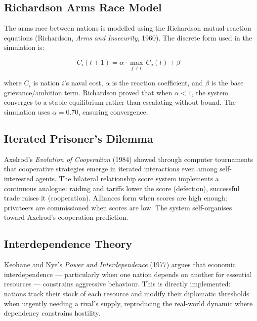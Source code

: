 \documentclass[12pt,a4paper]{article}
\begin{document}
\subsection{Richardson Arms Race Model}

The arms race between nations is modelled using the Richardson mutual-reaction equations (Richardson, \textit{Arms and Insecurity}, 1960). The discrete form used in the simulation is:

\begin{equation}
    C_i(t+1) = \alpha \cdot \max_{j \neq i}\, C_j(t) + \beta
    \label{eq:richardson}
\end{equation}

where $C_i$ is nation $i$'s naval cost, $\alpha$ is the reaction coefficient, and $\beta$ is the base grievance/ambition term. Richardson proved that when $\alpha < 1$, the system converges to a stable equilibrium rather than escalating without bound. The simulation uses $\alpha = 0.70$, ensuring convergence.

\subsection{Iterated Prisoner's Dilemma}

Axelrod's \textit{Evolution of Cooperation} (1984) showed through computer tournaments that cooperative strategies emerge in iterated interactions even among self-interested agents. The bilateral relationship score system implements a continuous analogue: raiding and tariffs lower the score (defection), successful trade raises it (cooperation). Alliances form when scores are high enough; privateers are commissioned when scores are low. The system self-organises toward Axelrod's cooperation prediction.

\subsection{Interdependence Theory}

Keohane and Nye's \textit{Power and Interdependence} (1977) argues that economic interdependence --- particularly when one nation depends on another for essential resources --- constrains aggressive behaviour. This is directly implemented: nations track their stock of each resource and modify their diplomatic thresholds when urgently needing a rival's supply, reproducing the real-world dynamic where dependency constrains hostility.

\end{document}
